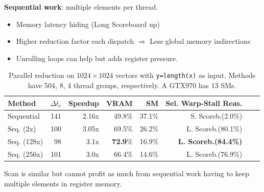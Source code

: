 \documentclass{beamer}
\begin{document}
\begin{frame}

\textbf{Sequential work}: multiple elements per thread.\begin{itemize}
  \item Memory latency hiding (Long Scoreboard up)
  \item Higher reduction factor each dispatch $\Rightarrow$ Less global memory indirections
  \item Unrolling loops can help but adds register pressure.
\end{itemize}
\begin{table}
  \footnotesize
  \begin{tabular}{ | l | r | r | r | r | r | r | r |}    \hline
    Method         &  $\Delta t_c$ & Speedup &VRAM              & SM              & Sel. Warp-Stall Reas.\\\hline
    Sequential     & 141                   & 2.16x   &49.8\%   & 37.1\%         & S. Scoreb.(2.0\%) \\\hline\hline
    Seq. (2x)      & 100                   & 3.05x   &69.5\%            & 26.2\%         & L. Scoreb.(80.1\%)\\\hline
    Seq. (128x)    & 98                    & 3.1x    &\textbf{72.9}\%   & 16.9\%         & \textbf{L. Scoreb.(84.4\%)}\\\hline
    Seq. (256x)    & 101                   & 3.0x    &66.4\%            & 14.6\%         & L. Scoreb.(76.9\%)\\
    \hline
  \end{tabular}
  \caption{\footnotesize Parallel reduction on $1024\times1024$ vectors with \texttt{y=length(x)} as input. Methods have 504, 8, 4 thread groups, respectively. A GTX970 has 13 SMs.}
\end{table}
\vspace{-10}
Scan is similar but cannot profit as much from sequential work having to keep multiple elements in register memory.
\end{frame}
\end{document}
